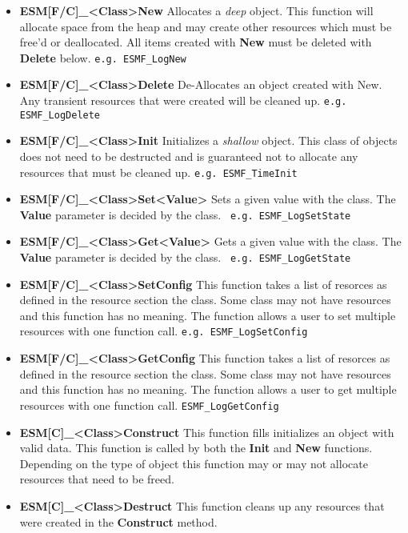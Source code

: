 \begin{itemize}
\item{\bf ESM[F/C]\_<Class>New} Allocates a {\it deep} object.  This
  function will allocate space from the heap and may create other
  resources which must be free'd or deallocated.  All items created
  with {\bf New} must be deleted with {\bf Delete} below.  {\tt e.g.
    ESMF\_LogNew}
  
\item{\bf ESM[F/C]\_<Class>Delete} De-Allocates an object created with
  New.  Any transient resources that were created will be cleaned up.
  {\tt e.g. ESMF\_LogDelete}
  
\item{\bf ESM[F/C]\_<Class>Init} Initializes a {\it shallow} object.
  This class of objects does not need to be destructed and is
  guaranteed not to allocate any resources that must be cleaned up.
  {\tt e.g. ESMF\_TimeInit}
  
\item{\bf ESM[F/C]\_<Class>Set<Value>} Sets a given value with the
  class.  The {\bf Value} parameter is decided by the class.  {\tt
    e.g. ESMF\_LogSetState}
  
\item{\bf ESM[F/C]\_<Class>Get<Value>} Gets a given value with the
  class.  The {\bf Value} parameter is decided by the class.  {\tt
    e.g. ESMF\_LogGetState}
  
\item{\bf ESM[F/C]\_<Class>SetConfig} This function takes a list of
  resorces as defined in the resource section the class.  Some class
  may not have resources and this function has no meaning.  The
  function allows a user to set multiple resources with one function
  call.  {\tt e.g. ESMF\_LogSetConfig}
  
\item{\bf ESM[F/C]\_<Class>GetConfig} This function takes a list of
  resorces as defined in the resource section the class.  Some class
  may not have resources and this function has no meaning.  The
  function allows a user to get multiple resources with one function
  call.  {\tt ESMF\_LogGetConfig}
  
\item{\bf ESM[C]\_<Class>Construct} This function fills initializes an
  object with valid data.  This function is called by both the {\bf
    Init} and {\bf New} functions.  Depending on the type of object
  this function may or may not allocate resources that need to be
  freed.
  
\item{\bf ESM[C]\_<Class>Destruct} This function cleans up any
  resources that were created in the {\bf Construct} method.

\end{itemize}

